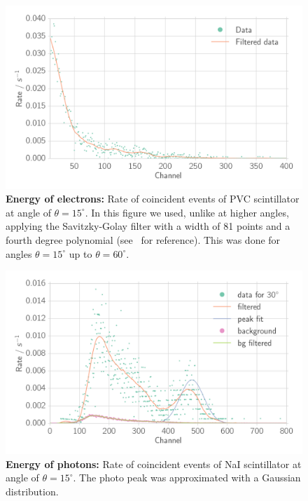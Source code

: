 \begin{figure}[htpb]
    \centering
    \includegraphics[width=0.9\linewidth]{./analysis/figures/coin_ps_15_filter_}
    \caption{\textbf{Energy of electrons:}
        Rate of coincident events of 
        PVC scintillator at angle of $\theta = 15^\circ$.
        In this figure we used, unlike at higher angles, applying the Savitzky-Golay filter
        with a width of 81 points and a fourth
        degree polynomial (see~\cite{scipy} for reference). This was done for 
        angles $\theta = 15^\circ$ up to $\theta = 60^\circ$.}
\label{fig:coin_ps_15}
\end{figure}

\begin{figure}[htpb]
    \centering
    \includegraphics[width=0.9\linewidth]{./analysis/figures/coin_na_30}
    \caption{\textbf{Energy of photons:} Rate of coincident events of 
        NaI scintillator at angle of $\theta = 15^\circ$. The photo peak was approximated
        with a Gaussian distribution.}
\label{fig:coin_na_30}
\end{figure}




